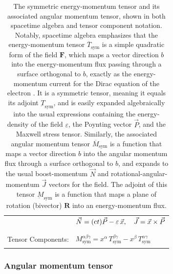 \documentclass[1p,sort&compress]{elsarticle}
\numberwithin{equation}{section}
\newcommand{\rv}[1]{\vec{#1}}
\newcommand{\bv}[1]{\mathbf{#1}}
\newcommand{\cc}{{\rm c}}
\begin{document}
\begin{table}
\begin{tabular}{l l}
    \\
    & $\displaystyle \rv{N} = (\cc t)\rv{P} - \varepsilon\,\rv{x}, \quad \rv{J} = \rv{x}\times\rv{P}$ \\
    \\
    \\
    Tensor Components: & $\displaystyle M_{\text{sym}}^{\alpha\beta\gamma} = x^{\alpha}\, T_{\text{sym}}^{\beta\gamma} - x^{\beta}\,T_{\text{sym}}^{\alpha\gamma}$ \\
    \\
    \hline 
 \end{tabular}
 \caption[Symmetric tensors]{The symmetric energy-momentum tensor and its associated angular momentum tensor, shown in both spacetime algebra and tensor component notation.  Notably, spacetime algebra emphasizes that the energy-momentum tensor $\overline{T}_{\text{sym}}$ is a simple quadratic form of the field $\bv{F}$, which maps a vector direction $b$ into the energy-momentum flux passing through a surface orthogonal to $b$, exactly as the energy-momentum current for the Dirac equation of the electron \cite{Berestetskii1982,Doran2007,Hiley2012}.  It is a symmetric tensor, meaning it equals its adjoint $\underbar{T}_{\text{sym}}$, and is easily expanded algebraically into the usual expressions containing the energy-density of the field $\varepsilon$, the Poynting vector $\rv{P}$, and the Maxwell stress tensor.  Similarly, the associated angular momentum tensor $\overline{M}_{\text{sym}}$ is a function that maps a vector direction $b$ into the angular momentum flux through a surface orthogonal to $b$, and expands to the usual boost-momentum $\rv{N}$ and rotational-angular-momentum $\rv{J}$ vectors for the field.  The adjoint of this tensor $\underbar{M}_{\text{sym}}$ is a function that maps a plane of rotation (bivector) $\bv{R}$ into an energy-momentum flux.}
 \label{tab:symtensors}
\end{table}


\subsubsection{Angular momentum tensor}\label{sec:symamstress}

\end{document}
